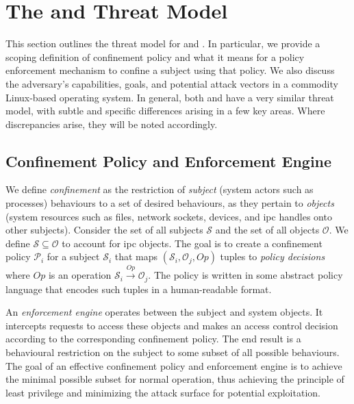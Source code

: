\section{The \bpfbox{} and \bpfcontain{} Threat Model}%
\label{s:cp-threat-model}

This section outlines the threat model for \bpfbox{} and \bpfcontain{}. In particular, we
provide a scoping definition of confinement policy and what it means for a policy
enforcement mechanism to confine a subject using that policy. We also discuss the
adversary's capabilities, goals, and potential attack vectors in a commodity Linux-based
operating system. In general, both \bpfbox{} and \bpfcontain{} have a very similar threat
model, with subtle and specific differences arising in a few key areas. Where
discrepancies arise, they will be noted accordingly.

\subsection{Confinement Policy and Enforcement Engine}

We define \textit{confinement} as the restriction of \textit{subject} (system actors such
as processes) behaviours to a set of desired behaviours, as they pertain to
\textit{objects} (system resources such as files, network sockets, devices, and \gls{ipc}
handles onto other subjects). Consider the set of all subjects $\mathcal{S}$ and the set
of all objects $\mathcal{O}$. We define $\mathcal{S} \subseteq \mathcal{O}$ to account for
\gls{ipc} objects. The goal is to create a confinement policy $\mathcal{P}_i$ for a subject
$\mathcal{S}_i$ that maps $(\mathcal{S}_i, \mathcal{O}_j, Op)$ tuples to \textit{policy
decisions} where $Op$ is an operation $\mathcal{S}_i \xrightarrow{Op} \mathcal{O}_j$.  The
policy is written in some abstract policy language that encodes such tuples in
a human-readable format.

An \textit{enforcement engine} operates between the subject and system objects. It
intercepts requests to access these objects and makes an access control decision according
to the corresponding confinement policy. The end result is a behavioural restriction on
the subject to some subset of all possible behaviours. The goal of an effective
confinement policy and enforcement engine is to achieve the minimal possible subset for
normal operation, thus achieving the principle of least privilege and minimizing the
attack surface for potential exploitation.

